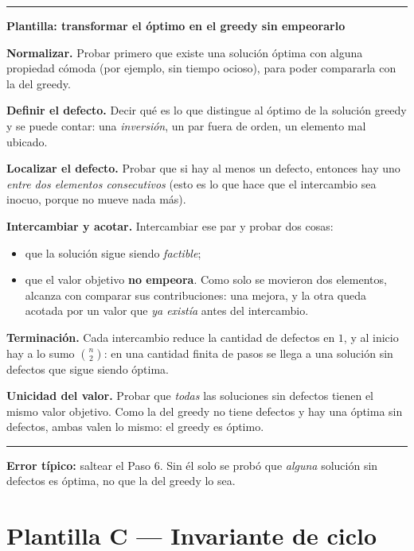\documentclass[11pt,a4paper]{article}
\theoremstyle{plain}
\theoremstyle{definition}
\theoremstyle{remark}
\newenvironment{plantilla}[1]{\par\medskip\noindent
  \begin{minipage}{\textwidth}\hrule\vspace{3pt}
  \noindent\textbf{Plantilla: #1}\par\smallskip}
  {\vspace{2pt}\hrule\end{minipage}\par\medskip}
\begin{document}
\begin{plantilla}{transformar el óptimo en el greedy sin empeorarlo}
\begin{pasos}
\item \textbf{Normalizar.} Probar primero que existe una solución óptima con alguna
propiedad cómoda (por ejemplo, sin tiempo ocioso), para poder compararla con la del
greedy.
\item \textbf{Definir el defecto.} Decir qué es lo que distingue al óptimo de la
solución greedy y se puede contar: una \emph{inversión}, un par fuera de orden, un
elemento mal ubicado.
\item \textbf{Localizar el defecto.} Probar que si hay al menos un defecto, entonces hay
uno \emph{entre dos elementos consecutivos} (esto es lo que hace que el intercambio sea
inocuo, porque no mueve nada más).
\item \textbf{Intercambiar y acotar.} Intercambiar ese par y probar dos cosas:
  \begin{itemize}
  \item que la solución sigue siendo \emph{factible};
  \item que el valor objetivo \textbf{no empeora}. Como solo se movieron dos elementos,
        alcanza con comparar sus contribuciones: una mejora, y la otra queda acotada por
        un valor que \emph{ya existía} antes del intercambio.
  \end{itemize}
\item \textbf{Terminación.} Cada intercambio reduce la cantidad de defectos en $1$, y al
inicio hay a lo sumo $\binom{n}{2}$: en una cantidad finita de pasos se llega a una
solución sin defectos que sigue siendo óptima.
\item \textbf{Unicidad del valor.} Probar que \emph{todas} las soluciones sin defectos
tienen el mismo valor objetivo. Como la del greedy no tiene defectos y hay una óptima
sin defectos, ambas valen lo mismo: el greedy es óptimo.
\end{pasos}
\end{plantilla}

\noindent\textbf{Error típico:} saltear el Paso 6. Sin él solo se probó que \emph{alguna}
solución sin defectos es óptima, no que la del greedy lo sea.

\section{Plantilla C --- Invariante de ciclo}
\end{document}
